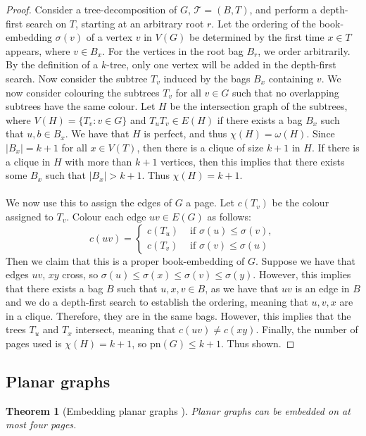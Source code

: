 \documentclass[]{report}
\newcommand{\tree}{\mathcal{T}}
\newcommand{\pn}{\text{pn}}
\newtheorem{theorem}{Theorem}
\theoremstyle{definition}
\numberwithin{theorem}{section}
\numberwithin{equation}{section}
\begin{document}
\begin{proof}
	Consider a tree-decomposition of $G$, $\tree = (B, T)$, and perform a depth-first search on $T$, starting at an arbitrary root $r$. Let the ordering of the book-embedding $\sigma(v)$ of a vertex $v$ in $V(G)$ be determined by the first time $x \in T$ appears, where $v \in B_x$. For the vertices in the root bag $B_r$, we order arbitrarily. By the definition of a $k$-tree, only one vertex will be added in the depth-first search. Now consider the subtree $T_v$ induced by the bags $B_x$ containing $v$. We now consider colouring the subtrees $T_v$ for all $v \in G$ such that no overlapping subtrees have the same colour. Let $H$ be the intersection graph of the subtrees, where $V(H) = \lbrace T_v : v \in G \rbrace$ and $T_u T_v \in E(H)$ if there exists a bag $B_x$ such that $u, b \in B_x$. We have that $H$ is perfect, and thus $\chi(H) = \omega(H)$. Since $|B_x| = k + 1$ for all $x \in V(T)$, then there is a clique of size $k + 1$ in $H$. If there is a clique in $H$ with more than $k+ 1$ vertices, then this implies that there exists some $B_x$ such that $|B_x| > k + 1$. Thus $\chi(H) = k + 1$. 
	\paragraph{}
	We now use this to assign the edges of $G$ a page. Let $c(T_v)$ be the colour assigned to $T_v$. Colour each edge $uv \in E(G)$ as follows:
	\begin{equation}
		c(uv) = 
		\begin{cases}
			c(T_u) &\text{ if } \sigma(u) \leq \sigma(v),\\
			c(T_v) &\text{ if } \sigma(v) \leq \sigma(u)
		\end{cases}
	\end{equation}
	Then we claim that this is a proper book-embedding of $G$. Suppose we have that edges $uv$, $xy$ cross, so $\sigma(u) \leq \sigma(x) \leq \sigma(v) \leq \sigma(y)$. However, this implies that there exists a bag $B$ such that $u, x, v \in B$, as we have that $uv$ is an edge in $B$ and we do a depth-first search to establish the ordering, meaning that $u, v, x$ are in a clique. Therefore, they are in the same bags. However, this implies that the trees $T_u$ and $T_x$ intersect, meaning that $c(uv) \neq c(xy)$. Finally, the number of pages used is $\chi(H) = k + 1$, so $\pn(G) \leq k + 1$. Thus shown.
\end{proof}

\subsection{Planar graphs}\label{ssec:Planar_Graphs}
\begin{theorem}[Embedding planar graphs \cite{yannakakisEmbeddingPlanarGraphs1989b}] \label{thm:4Pages_Planar}
	Planar graphs can be embedded on at most four pages.
\end{theorem}
\end{document}
